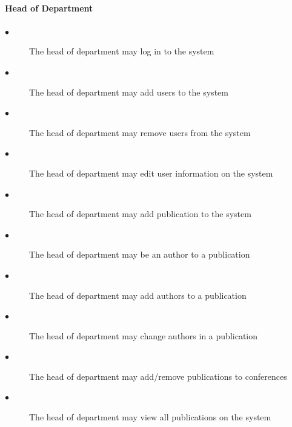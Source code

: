 \documentclass[a4paper]{article}
\begin{document}
	\paragraph{\textbf{Head of Department}}
	\begin{description}
		\item[$\bullet$] The head of department may log in to the system
		\item[$\bullet$] The head of department may add users to the system
		\item[$\bullet$] The head of department may remove users from the system
		\item[$\bullet$] The head of department may edit user information on the system
		\item[$\bullet$] The head of department may add publication to the system
		\item[$\bullet$] The head of department may be an author to a publication
		\item[$\bullet$] The head of department may add authors to a publication
		\item[$\bullet$] The head of department may change authors in a publication
		\item[$\bullet$] The head of department may add/remove publications to conferences
		\item[$\bullet$] The head of department may view all publications on the system
	\end{description}
\end{document}
